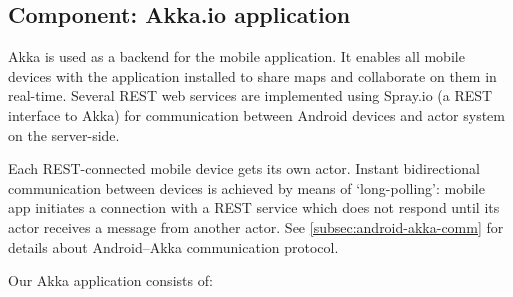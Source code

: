%
%
%
%
%

\subsection{Component: Akka.io application}
\label{subsec:component-akka}

Akka is used as a backend for the mobile application. It enables all mobile devices with the application installed to share maps and collaborate on them in real-time. Several REST web services are implemented using Spray.io (a REST interface to Akka) for communication between Android devices and actor system on the server-side.

Each REST-connected mobile device gets its own actor. Instant bidirectional communication between devices is achieved by means of `long-polling': mobile app initiates a connection with a REST service which does not respond until its actor receives a message from another actor. See \cref{subsec:android-akka-comm} for details about Android--Akka communication protocol.

Our Akka application consists of:

